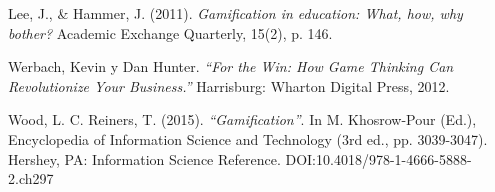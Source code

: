 \begin{thebibliography}{9}
        Lee, J., \& Hammer, J. (2011).
        {\it Gamification in education: What, how, why bother?}
        Academic Exchange Quarterly, 15(2), p. 146.

        Werbach, Kevin y Dan Hunter.
        {\it ``For the Win: How Game Thinking Can Revolutionize Your Business.''}
        Harrisburg: Wharton Digital Press, 2012.

        Wood, L. C. Reiners, T. (2015).
        {\it ``Gamification''}. In M. Khosrow-Pour (Ed.), Encyclopedia of Information Science and Technology (3rd ed., pp. 3039-3047).
        Hershey, PA: Information Science Reference. DOI:10.4018/978-1-4666-5888-2.ch297








\end{thebibliography}
